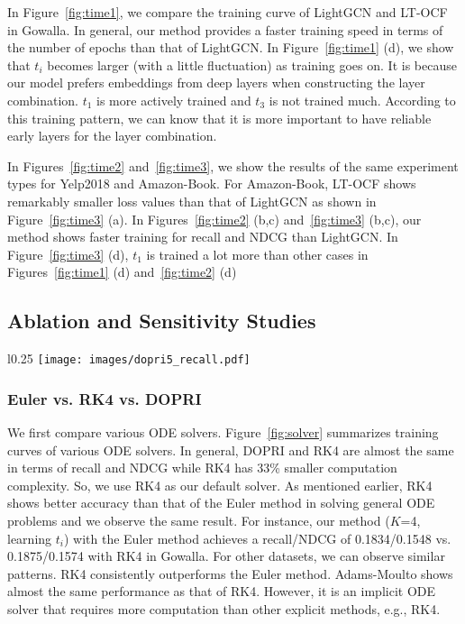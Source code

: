 \documentclass[sigconf]{acmart}
\begin{document}
In Figure~\ref{fig:time1}, we compare the training curve of LightGCN and LT-OCF in Gowalla. In general, our method provides a faster training speed in terms of the number of epochs than that of LightGCN. In Figure~\ref{fig:time1} (d), we show that $t_i$ becomes larger (with a little fluctuation) as training goes on. It is because our model prefers embeddings from deep layers when constructing the layer combination. $t_1$ is more actively trained and $t_3$ is not trained much. According to this training pattern, we can know that it is more important to have reliable early layers for the layer combination.

In Figures~\ref{fig:time2} and~\ref{fig:time3}, we show the results of the same experiment types for Yelp2018 and Amazon-Book. For Amazon-Book, LT-OCF shows remarkably smaller loss values than that of LightGCN as shown in Figure~\ref{fig:time3} (a). In Figures~\ref{fig:time2} (b,c) and~\ref{fig:time3} (b,c), our method shows faster training for recall and NDCG than LightGCN. In Figure~\ref{fig:time3} (d), $t_1$ is trained a lot more than other cases in Figures~\ref{fig:time1} (d) and~\ref{fig:time2} (d)

\subsection{Ablation and Sensitivity Studies}
\begin{wrapfigure}{l}{0.25\textwidth}
\vspace{-1em}
    \centering
    \texttt{[image: images/dopri5\_recall.pdf]}
    \caption{Various ODE solvers}
    \label{fig:solver}
\end{wrapfigure}

\subsubsection{Euler vs. RK4 vs. DOPRI} We first compare various ODE solvers. Figure~\ref{fig:solver} summarizes training curves of various ODE solvers. In general, DOPRI and RK4 are almost the same in terms of recall and NDCG while RK4 has 33\% smaller computation complexity. So, we use RK4 as our default solver. As mentioned earlier, RK4 shows better accuracy than that of the Euler method in solving general ODE problems and we observe the same result. For instance, our method ($K$=4, learning $t_i$) with the Euler method achieves a recall/NDCG of 0.1834/0.1548 vs. 0.1875/0.1574 with RK4 in Gowalla. For other datasets, we can observe similar patterns. RK4 consistently outperforms the Euler method. Adams-Moulto shows almost the same performance as that of RK4. However, it is an implicit ODE solver that requires more computation than other explicit methods, e.g., RK4.
\end{document}
